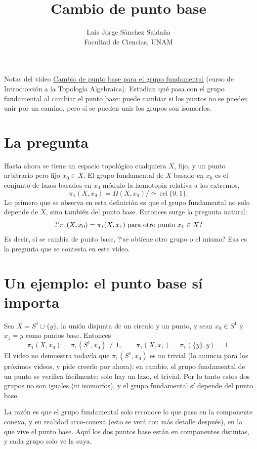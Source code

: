 \documentclass[11pt]{article}
\title{Cambio de punto base}
\author{Luis Jorge Sánchez Saldaña\\[2pt]\small Facultad de Ciencias, UNAM}
\date{}
\begin{document}
\maketitle

\noindent\small Notas del video
\href{https://www.youtube.com/watch?v=8tnjx0tEn4g}{\guillemotleft{}Cambio de punto base para el grupo fundamental\guillemotright{}}
(curso de Introducción a la Topología Algebraica). Estudian qué pasa con el grupo fundamental al cambiar el punto base: puede cambiar si los puntos no se pueden unir por un camino, pero si se pueden unir los grupos son isomorfos.
\normalsize

\section*{La pregunta}

Hasta ahora se tiene un espacio topológico cualquiera $X$, fijo, y un punto arbitrario pero fijo $x_0\in X$. El grupo fundamental de $X$ basado en $x_0$ es el conjunto de lazos basados en $x_0$ módulo la homotopía relativa a los extremos,
\[
  \pi_1(X,x_0)=\Omega(X,x_0)\big/\!\simeq\ \mathrm{rel}\ \{0,1\}.
\]
Lo primero que se observa en esta definición es que el grupo fundamental no solo depende de $X$, sino también del punto base. Entonces surge la pregunta natural:
\[
  ?`\pi_1(X,x_0)=\pi_1(X,x_1)\ \text{para otro punto } x_1\in X?
\]
Es decir, si se cambia de punto base, ?`se obtiene otro grupo o el mismo? Esa es la pregunta que se contesta en este video.

\section*{Un ejemplo: el punto base sí importa}

Sea $X=S^1\sqcup\{y\}$, la unión disjunta de un círculo y un punto, y sean $x_0\in S^1$ y $x_1=y$ como puntos base. Entonces
\[
  \pi_1(X,x_0)=\pi_1(S^1,x_0)\neq 1,
  \qquad
  \pi_1(X,x_1)=\pi_1(\{y\},y)=1.
\]
El video no demuestra todavía que $\pi_1(S^1,x_0)$ es no trivial (lo anuncia para los próximos videos, y pide creerlo por ahora); en cambio, el grupo fundamental de un punto se verifica fácilmente: solo hay un lazo, el trivial. Por lo tanto estos dos grupos no son iguales (ni isomorfos), y el grupo fundamental sí depende del punto base.

La razón es que el grupo fundamental solo reconoce lo que pasa en la componente conexa, y en realidad arco-conexa (esto se verá con más detalle después), en la que vive el punto base. Aquí los dos puntos base están en componentes distintas, y cada grupo solo \guillemotleft{}ve\guillemotright{} la suya.
\end{document}
